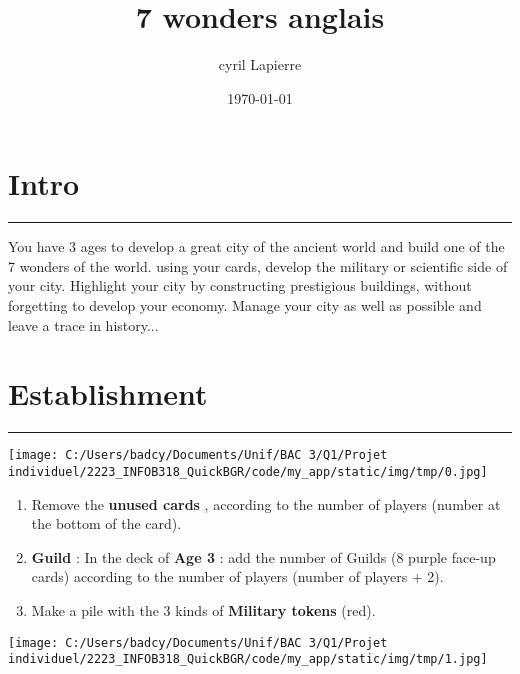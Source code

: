 \documentclass{scrartcl}%
\title{7 wonders anglais}%
\author{cyril Lapierre}%
\date{\today}%
\begin{document}
%
\normalsize%
\maketitle\thispagestyle{header}%
\pagestyle{header}%
\sectionfont{\color{blue}}%
\subsectionfont{\color{blue}}%
\subsubsectionfont{\color{blue}}%
\section{ Intro
}%
\label{sec:Intro}%
\textcolor{blue}{\rule{18cm}{0.07cm}}\break%
You have 3 ages to develop a great city of the ancient world and build one of the 7 wonders of the
%
world. using your cards, develop the military or scientific side of your city. Highlight
%
your city by constructing prestigious buildings, without forgetting to develop your economy.
%
Manage your city as well as possible and leave a trace in history...


%
\sectionfont{\color{mygreen}}%
\subsectionfont{\color{mygreen}}%
\subsubsectionfont{\color{mygreen}}%
\section{ Establishment
}%
\label{sec:Establishment}%
\textcolor{mygreen}{\rule{18cm}{0.07cm}}\break%
%
\begin{center}\texttt{[image: C:/Users/badcy/Documents/Unif/BAC 3/Q1/Projet individuel/2223\_INFOB318\_QuickBGR/code/my\_app/static/img/tmp/0.jpg]}\end{center}%
%
\begin{enumerate}%
\item%
%
 Remove the %
\textcolor{mygreen}{%
\textbf{unused cards}%
}%
, according to the number of players (number at the bottom of the card).
%
\item%
%
\textcolor{mygreen}{%
\textbf{Guild}%
}%
: In the deck of %
\textcolor{mygreen}{%
\textbf{Age 3}%
}%
: add the number of Guilds (8 purple face{-}up cards) according to the number of players (number of players + 2).
%
\item%
%
 Make a pile with the 3 kinds of %
\textcolor{mygreen}{%
\textbf{Military tokens}%
}%
\textit{ }%
 (red).
%
\end{enumerate}%
%
\begin{center}\texttt{[image: C:/Users/badcy/Documents/Unif/BAC 3/Q1/Projet individuel/2223\_INFOB318\_QuickBGR/code/my\_app/static/img/tmp/1.jpg]}\end{center}%
\end{document}
